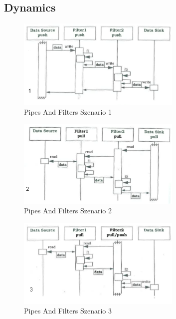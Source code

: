 \subsection*{Dynamics}

\begin{figure}[H]
	\centering
	\includegraphics[width=0.7\textwidth]{content/posa1/images/pipes-and-filters-szen1.png}
	\caption{Pipes And Filters Szenario 1}
\end{figure}

\begin{figure}[H]
	\centering
	\includegraphics[width=0.7\textwidth]{content/posa1/images/pipes-and-filters-szen2.png}
	\caption{Pipes And Filters Szenario 2}
\end{figure}

\begin{figure}[H]
	\centering
	\includegraphics[width=0.7\textwidth]{content/posa1/images/pipes-and-filters-szen3.png}
	\caption{Pipes And Filters Szenario 3}
\end{figure}

